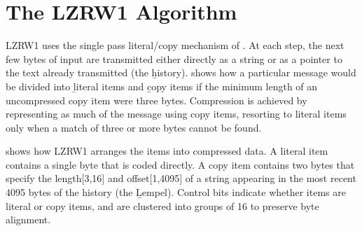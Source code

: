 \section{The LZRW1 Algorithm}

LZRW1 uses the single pass  literal/copy mechanism of . At
each step, the next few bytes of input are transmitted either directly
as  a string  or as  a pointer  to the  text already  transmitted (the
\b{history}).   shows how a particular  message would be
divided  into \b{literal  items}  and \b{copy  items}  if the  minimum
length of an  uncompressed copy item were three  bytes. Compression is
achieved  by representing  as much  of the  message using  copy items,
resorting to  literal items only when  a match of three  or more bytes
cannot be found.

\begin{figure}[ht]
\vspace{4.5cm}
\end{figure}

  shows how  LZRW1  arranges the  items into  compressed
data. A literal item contains a  single byte that is coded directly. A
copy  item  contains  two  bytes that  specify  the  length[3,16]  and
offset[1,4095] of a string appearing in  the most recent 4095 bytes of
the history (the \b{Lempel}). Control  bits indicate whether items are
literal or copy items, and are clustered into groups of 16 to preserve
byte alignment.

\begin{figure}[ht]
\vspace{9cm}
\end{figure}

